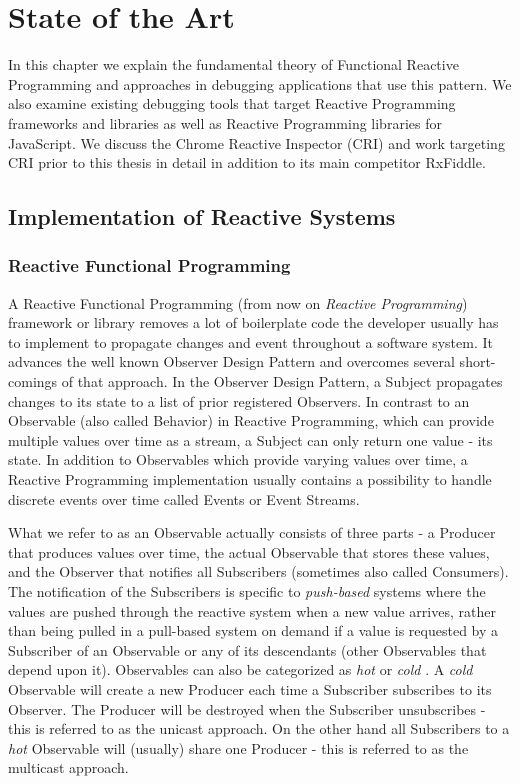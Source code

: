 \chapter{State of the Art} \label{ch:State of the Art}
In this chapter we explain the fundamental theory of Functional Reactive Programming and approaches in debugging applications that use this pattern. We also examine existing debugging tools that target Reactive Programming frameworks and libraries as well as Reactive Programming libraries for JavaScript. We discuss the Chrome Reactive Inspector (CRI) and work targeting CRI prior to this thesis in detail in addition to its main competitor RxFiddle.

\section{Implementation of Reactive Systems}
	\subsection{Reactive Functional Programming}
	A Reactive Functional Programming \cite{FRP} (from now on \emph{Reactive Programming}) framework or library removes a lot of boilerplate code the developer usually has to implement to propagate changes and event throughout a software system. It advances the well known Observer Design Pattern and overcomes several short-comings of that approach. In the Observer Design Pattern, a Subject propagates changes to its state to a list of prior registered Observers. In contrast to an Observable (also called Behavior) in Reactive Programming, which can provide multiple values over time as a stream, a Subject can only return one value - its state.
	In addition to Observables which provide varying values over time, a Reactive Programming implementation usually contains a possibility to handle discrete events over time called Events or Event Streams\cite{BaconJS}.
	
	What we refer to as an Observable actually consists of three parts - a Producer that produces values over time, the actual Observable that stores these values, and the Observer that notifies all Subscribers (sometimes also called Consumers). The notification of the Subscribers is specific to \emph{push-based} systems where the values are pushed through the reactive system when a new value arrives, rather than being pulled in a pull-based system on demand if a value is requested by a Subscriber of an Observable or any of its descendants (other Observables that depend upon it).
	Observables can also be categorized as \emph{hot} or \emph{cold} \cite{HotVsCold}. A \emph{cold} Observable will create a new Producer each time a Subscriber subscribes to its Observer. The Producer will be destroyed when the Subscriber unsubscribes - this is referred to as the unicast approach. On the other hand all Subscribers to a \emph{hot} Observable will (usually) share one Producer - this is referred to as the multicast approach.
	
